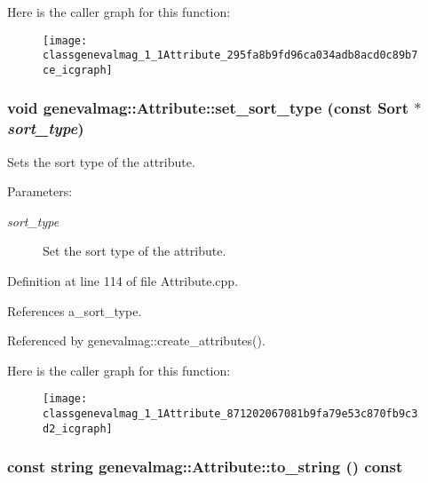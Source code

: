 Here is the caller graph for this function:\nopagebreak
\begin{figure}[H]
\begin{center}
\leavevmode
\texttt{[image: classgenevalmag\_1\_1Attribute\_295fa8b9fd96ca034adb8acd0c89b7ce\_icgraph]}
\end{center}
\end{figure}
\hypertarget{classgenevalmag_1_1Attribute_871202067081b9fa79e53c870fb9c3d2}{
\subsubsection[{set\_\-sort\_\-type}]{\setlength{\rightskip}{0pt plus 5cm}void genevalmag::Attribute::set\_\-sort\_\-type (const {\bf Sort} $\ast$ {\em sort\_\-type})}}
\label{classgenevalmag_1_1Attribute_871202067081b9fa79e53c870fb9c3d2}


Sets the sort type of the attribute. \begin{Desc}
\item[Parameters:]
\begin{description}
\item[{\em sort\_\-type}]Set the sort type of the attribute. \end{description}
\end{Desc}


Definition at line 114 of file Attribute.cpp.

References a\_\-sort\_\-type.

Referenced by genevalmag::create\_\-attributes().

Here is the caller graph for this function:\nopagebreak
\begin{figure}[H]
\begin{center}
\leavevmode
\texttt{[image: classgenevalmag\_1\_1Attribute\_871202067081b9fa79e53c870fb9c3d2\_icgraph]}
\end{center}
\end{figure}
\hypertarget{classgenevalmag_1_1Attribute_27c1b94db4a836b9fcda1d26146d1db6}{
\subsubsection[{to\_\-string}]{\setlength{\rightskip}{0pt plus 5cm}const string genevalmag::Attribute::to\_\-string () const}}
\label{classgenevalmag_1_1Attribute_27c1b94db4a836b9fcda1d26146d1db6}



